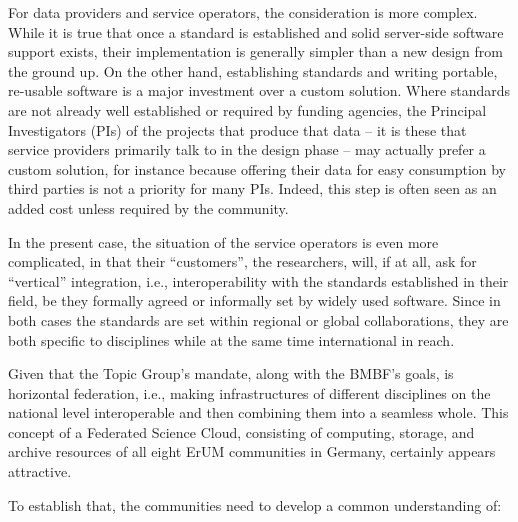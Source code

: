 \documentclass{article}
\begin{document}
For data providers and service operators, the consideration is more
complex.  While it is true that once a standard is established and solid
server-side software support exists, their implementation is generally
simpler than a new design from the ground up.  On the other hand,
establishing standards and writing portable, re-usable software is a
major investment over a custom solution.  Where standards are not
already well established or required by funding agencies, the Principal
Investigators (PIs) of the projects that produce that data --
it is these that service providers primarily talk to in the design phase
-- may actually prefer a custom
solution, for instance because offering their data for easy consumption by
third parties is not a priority for many PIs.  Indeed, this step is
often seen as an added cost unless required by the community.

In the present case, the situation of the service operators is even more
complicated, in that their ``customers'', the researchers, will, if at
all, ask for ``vertical'' integration, i.e., interoperability with
the standards established in their field, be they formally agreed or
informally set by widely used software.  Since in both cases the
standards are set within regional or global collaborations, they are
both specific to disciplines while at the same time international in
reach.

Given that the Topic Group's mandate, along with the BMBF's 
goals, is horizontal federation, i.e., making 
infrastructures of different disciplines on the national level
interoperable and then combining them into a seamless whole.  This
concept of a Federated Science Cloud, consisting of computing,
storage, and archive resources of all eight ErUM communities in Germany,
certainly appears attractive.

To establish that, the communities need to develop a common
understanding of:
\end{document}
